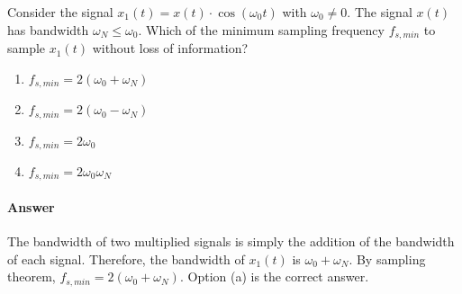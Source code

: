 \documentclass[12pt,a4paper]{article}
\begin{document}
\begin{q}{}
Consider the signal $x_{1}(t) = x(t) \cdot \cos(\omega_0 t)$ with $\omega_0 \neq 0$. The signal $x(t)$ has bandwidth $\omega_N \leq \omega_0$. Which of the minimum sampling frequency $f_{s, min}$ to sample $x_{1}(t)$ without loss of information?

\begin{enumerate}[label=(\alph*)]
    \item $f_{s,min} = 2(\omega_{0}+\omega_{N})$
    \item $f_{s,min} = 2(\omega_{0}-\omega_{N})$
    \item $f_{s,min} = 2\omega_{0}$
    \item $f_{s,min} = 2\omega_{0}\omega_{N}$
\end{enumerate}

\paragraph{Answer}
The bandwidth of two multiplied signals is simply the addition of the bandwidth of each signal. Therefore, the bandwidth of $x_1(t)$ is $\omega_0 + \omega_N$. By sampling theorem, $f_{s,min} = 2(\omega_{0}+\omega_{N})$. Option (a) is the correct answer.
\end{q}
\end{document}
